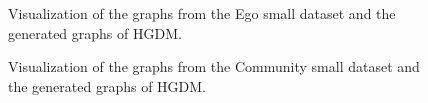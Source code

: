 \documentclass[letterpaper]{article} %
\begin{document}
\begin{figure}[htbp]
\centering
{} 
    \hspace{0.3in}
    \caption{Visualization of the graphs from the Ego small dataset and the generated graphs of HGDM.}
    \label{fig:vis_es}
\end{figure}
\begin{figure}[htbp]
\centering
{} 
    \hspace{0.3in}
    \caption{Visualization of the graphs from the Community small dataset and the generated graphs of HGDM.}
    \label{fig:vis_cs}
\end{figure}
\end{document}
